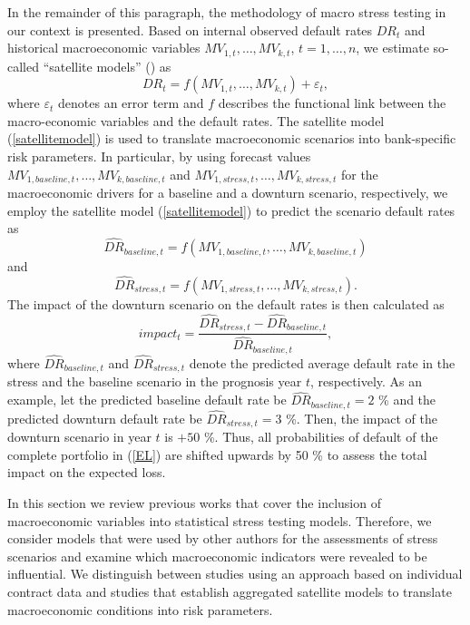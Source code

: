\documentclass[a4paper, 12pt]{scrreprt}
\begin{document}
In the remainder of this paragraph, the methodology of macro stress testing in our context is presented.
Based on internal observed default rates $DR_t$ and historical macroeconomic variables $MV_{1,t}, \ldots, MV_{k,t}$, $t=1,\ldots,n$, we estimate so-called ``satellite models'' (\textcite[p. 17]{ecb2018srep}) as
\begin{equation}\label{satellitemodel}
DR_t = f(MV_{1,t}, \ldots, MV_{k,t}) + \varepsilon_t,
\end{equation}
where $\varepsilon_t$ denotes an error term and $f$ describes the functional link between the macro-economic variables and the default rates.
The satellite model (\ref{satellitemodel}) is used to translate macroeconomic scenarios into bank-specific risk parameters.
In particular, by using forecast values $MV_{1, baseline,t}, \ldots, MV_{k, baseline,t}$ and $MV_{1, stress,t}, \ldots, MV_{k, stress,t}$ for the macroeconomic drivers for a baseline and a downturn scenario, respectively, we employ the satellite model (\ref{satellitemodel}) to predict the scenario default rates as
\begin{equation}\label{satellitemodel_forecast_baseline}
\widehat{DR}_{baseline,t} = f(MV_{1, baseline,t}, \ldots, MV_{k, baseline,t})
\end{equation}
and
\begin{equation}\label{satellitemodel_forecast_stress}
\widehat{DR}_{stress,t} = f(MV_{1, stress,t}, \ldots, MV_{k, stress,t}).
\end{equation}
The impact of the downturn scenario on the default rates is then calculated as
\begin{equation}\label{stressimpact}
impact_t = \frac{\widehat{DR}_{stress,t} - \widehat{DR}_{baseline,t}}{\widehat{DR}_{baseline,t}},
\end{equation}
where $\widehat{DR}_{baseline,t}$ and $\widehat{DR}_{stress,t}$ denote the predicted average default rate in the stress and the baseline scenario in the prognosis year $t$, respectively. As an example, let the predicted baseline default rate be $\widehat{DR}_{baseline,t} = 2$ \% and the predicted downturn default rate be $\widehat{DR}_{stress,t} = 3$ \%. Then, the impact of the downturn scenario in year $t$ is $+50$ \%. Thus, all probabilities of default of the complete portfolio in (\ref{EL}) are shifted upwards by 50 \% to assess the total impact on the expected loss.




\bigskip

In this section we review previous works that cover the inclusion of macroeconomic variables into statistical stress testing models. Therefore, we consider models that were used by other authors for the assessments of stress scenarios and examine which macroeconomic indicators were revealed to be influential.
We distinguish between studies using an approach based on individual contract data and studies that establish aggregated satellite models to translate macroeconomic conditions into risk parameters.
\end{document}
